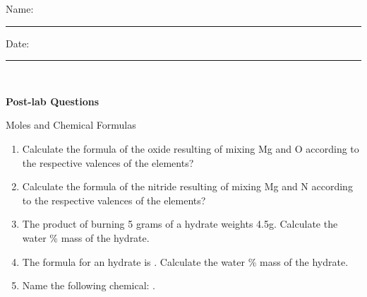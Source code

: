 \documentclass[main.tex]{subfiles}
\begin{document}
\newpage
\begin{multicols}{2}
\begin{tcolorbox}[enhanced jigsaw,breakable,size=title,
colback=mybrown!05,colframe=black,fonttitle=\bfseries,
title=STUDENT INFO,pad at break=1mm, break at=15cm/0pt ]
\vspace{0.2cm}
\noindent Name: \rule{5cm}{0.4pt}Date:\rule{1cm}{0.4pt}\\
 \end{tcolorbox}
\end{multicols}
\hfill
\vspace{0.2cm}
\begin{center}
{\large \bfseries 
Post-lab Questions 
\par
\Huge
Moles and Chemical Formulas
\\[5pt] \par}
\vspace{0.2cm}
\end{center}
\par
\noindent
\uline{  \hfill \normalsize \hfill       }
\begin{enumerate}
\item Calculate the formula of the oxide resulting of mixing Mg and O according to the respective valences of the elements?
\vspace{4.cm}
\item Calculate the formula of the nitride resulting of mixing Mg and N according to the respective valences of the elements?
\vspace{4.cm}
\item The product of burning 5 grams of a hydrate weights 4.5g. Calculate the water \% mass of the hydrate.
\vspace{3.7cm}
\item The formula for an hydrate is  . Calculate the water \% mass of the hydrate.
\vspace{3.7cm}
\item Name the following chemical:  .
\vspace{3.7cm}
\end{enumerate}


 
\end{document}
